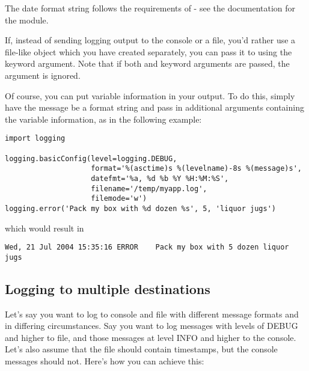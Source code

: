 The date format string follows the requirements of  -
see the documentation for the  module.

If, instead of sending logging output to the console or a file, you'd rather
use a file-like object which you have created separately, you can pass it
to  using the  keyword argument. Note
that if both  and  keyword arguments are passed,
the  argument is ignored.

Of course, you can put variable information in your output. To do this,
simply have the message be a format string and pass in additional arguments
containing the variable information, as in the following example:

\begin{verbatim}
import logging

logging.basicConfig(level=logging.DEBUG,
                    format='%(asctime)s %(levelname)-8s %(message)s',
                    datefmt='%a, %d %b %Y %H:%M:%S',
                    filename='/temp/myapp.log',
                    filemode='w')
logging.error('Pack my box with %d dozen %s', 5, 'liquor jugs')
\end{verbatim}

which would result in

\begin{verbatim}
Wed, 21 Jul 2004 15:35:16 ERROR    Pack my box with 5 dozen liquor jugs
\end{verbatim}

\subsection{Logging to multiple destinations \label{multiple-destinations}}

Let's say you want to log to console and file with different message formats
and in differing circumstances. Say you want to log messages with levels
of DEBUG and higher to file, and those messages at level INFO and higher to
the console. Let's also assume that the file should contain timestamps, but
the console messages should not. Here's how you can achieve this:

